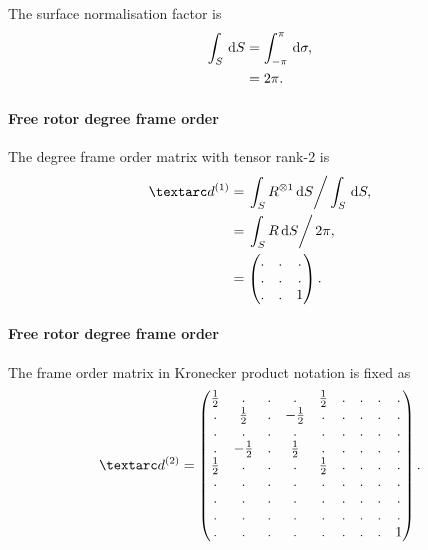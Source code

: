 The surface normalisation factor is
\begin{subequations}
\begin{align}
    \int_S \,\mathrm{d} S &= \int_{-\pi}^{\pi} \,\mathrm{d} \sigma , \\
                   &= 2\pi .
\end{align}
\end{subequations}


\paragraph{Free rotor  degree frame order}

The  degree frame order matrix with tensor rank-2 is
\begin{subequations} \label{eq: free rotor 1st degree frame order matrix}
\begin{align}
    \FOone &= \left. \int_S R^{\otimes 1} \diff S \right / \int_S \diff S, \\
           &= \left. \int_S R \diff S \right / 2\pi, \\
           &= \begin{pmatrix}
                  . & . & . \\
                  . & . & . \\
                  . & . & 1 \\
              \end{pmatrix} .
\end{align}
\end{subequations}


\paragraph{Free rotor  degree frame order}

The frame order matrix in Kronecker product notation is fixed as
\begin{equation} \label{eq: free rotor 2nd degree frame order matrix}
    \FOtwo =
        \begin{pmatrix}
            \half & .      & . & .      & \half & . & . & . & . \\
            .     & \half  & . & -\half & .     & . & . & . & . \\
            .     & .      & . & .      & .     & . & . & . & . \\
            .     & -\half & . & \half  & .     & . & . & . & . \\
            \half & .      & . & .      & \half & . & . & . & . \\
            .     & .      & . & .      & .     & . & . & . & . \\
            .     & .      & . & .      & .     & . & . & . & . \\
            .     & .      & . & .      & .     & . & . & . & . \\
            .     & .      & . & .      & .     & . & . & . & 1 \\
        \end{pmatrix} .
\end{equation}


